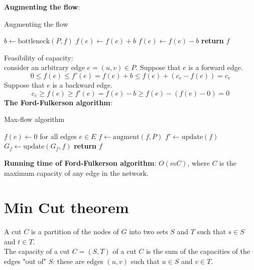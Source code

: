 \documentclass[onecolumn]{report}
\begin{document}
\textbf{Augmenting the flow}:\\
\begin{algorithm}
\caption{Augmenting the flow}
\begin{algorithmic}[1]
        \State $b \gets \text{bottleneck}(P,f)$
                \State $f(e) \gets f(e)+b$
            \Else
                \State $f(e) \gets f(e)-b$
            \EndIf
        \EndFor
        \State \textbf{return} $f$
    \EndProcedure
\end{algorithmic}
\end{algorithm}
\noindent
Feasibility of capacity:\\
consider an arbitrary edge $e=(u,v)\in P$. Suppose that $e$ is a forward edge.
\begin{equation*}
    0 \leq f(e) \leq f'(e) = f(e)+b \leq f(e)+(c_e-f(e))=c_e
\end{equation*}
Suppose that $e$ is a backward edge.
\begin{equation*}
    c_e \geq f(e) \geq f'(e) = f(e)-b \geq f(e)-(f(e)-0)=0
\end{equation*}
\noindent
\textbf{The Ford-Fulkerson algorithm}:\\
\begin{algorithm}[H]
\caption{Max-flow algorithm}
\begin{algorithmic}[1]
        \State $f(e) \gets 0$ for all edges $e\in E$
            \State $f \gets \text{augment}(f,P)$
            \State $f' \gets \text{update} (f)$
            \State $G_f \gets \text{update}(G_f,f)$
        \EndWhile
        \State \textbf{return} $f$
    \EndProcedure
\end{algorithmic}
\end{algorithm}
\noindent
\textbf{Running time of Ford-Fulkerson algorithm}: $O(mC)$, where $C$ is the maximum capacity of any edge in the network.\\


\section{Min Cut theorem}
A cut $C$ is a partition of the nodes of $G$ into two sets $S$ and $T$ such that $s\in S$ and $t\in T$.\\
The capacity of a cut $C=(S,T)$ of a cut $C$ is the sum of the capacities of the edges "out of" $S$: these are edges $(u,v)$ such that $u\in S$ and $v\in T$.\\
\end{document}
